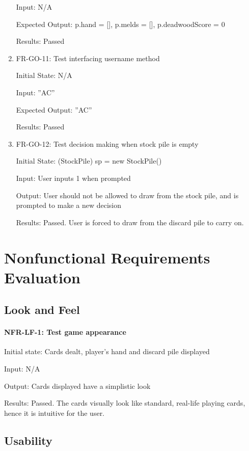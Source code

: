 \documentclass[12pt, titlepage]{article}
\begin{document}
\begin{enumerate}
    Input: N/A
    
    Expected Output: p.hand = [], p.melds = [], p.deadwoodScore = 0

    Results: Passed
    
    \item FR-GO-11: Test interfacing username method
    
    Initial State: N/A
    
    Input: ”AC”
    
    Expected Output: ”AC”

    Results: Passed
    
    \item FR-GO-12: Test decision making when stock pile is empty
    
    Initial State: (StockPile) sp = new StockPile()
    
    Input: User inputs 1 when prompted
    
    Output: User should not be allowed to draw from the stock pile, and is prompted to make a new decision
    
    Results: Passed. User is forced to draw from the discard pile to carry on.
\end{enumerate}

\section{Nonfunctional Requirements Evaluation}

\subsection{Look and Feel}
\paragraph{NFR-LF-1: Test game appearance\\}

Initial state: Cards dealt, player's hand and discard pile displayed

Input: N/A

Output: Cards displayed have a simplistic look

Results: Passed. The cards visually look like standard, real-life playing cards, hence it is intuitive for the user.

\subsection{Usability}
\end{document}
